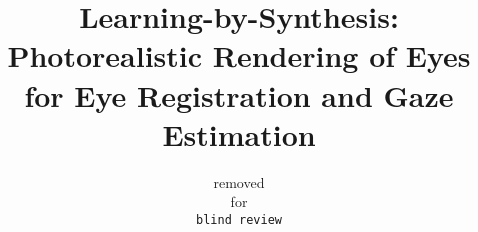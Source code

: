 \documentclass[10pt,twocolumn,letterpaper]{article}
\begin{document}
\title{Learning-by-Synthesis: Photorealistic Rendering of Eyes for Eye Registration and Gaze Estimation}

\author{removed\\
for\\
{\tt\small blind review}
}

\maketitle

\begin{abstract}

\end{abstract}









{\small


}
\end{document}
